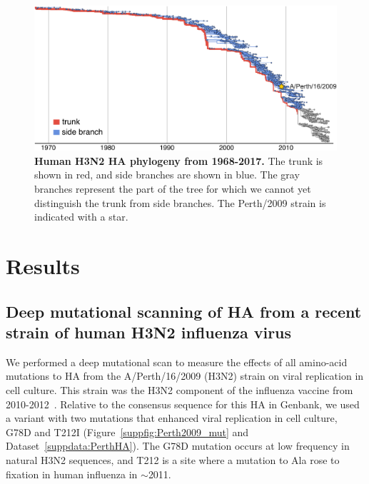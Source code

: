 \documentclass[9pt,twocolumn,twoside]{pnas-new}
\begin{document}
\begin{figure}
\centering
\includegraphics[width=\columnwidth]{figs/H3N2_phylogeny/H3N2_phylogeny.pdf}
\caption{\label{fig:H3N2_phylogeny}
{\bf Human H3N2 HA phylogeny from 1968-2017.}
The trunk is shown in red, and side branches are shown in blue.
The gray branches represent the part of the tree for which we cannot yet distinguish the trunk from side branches.
The Perth/2009 strain is indicated with a star.
}
\end{figure}


 

\section*{Results}
\label{sec:results}

\subsection*{Deep mutational scanning of HA from a recent strain of human H3N2 influenza virus}
We performed a deep mutational scan to measure the effects of all amino-acid mutations to HA from the A/Perth/16/2009 (H3N2) strain on viral replication in cell culture. 
This strain was the H3N2 component of the influenza vaccine from 2010-2012~\cite{who2010d,who2011}.
Relative to the consensus sequence for this HA in Genbank, we used a variant with two mutations that enhanced viral replication in cell culture, G78D and T212I (Figure~\ref{suppfig:Perth2009_mut} and Dataset~\ref{suppdata:PerthHA}).
The G78D mutation occurs at low frequency in natural H3N2 sequences, and T212 is a site where a mutation to Ala rose to fixation in human influenza in $\sim$2011.
\end{document}
